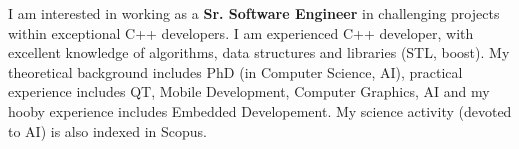 
I am interested in working as a \textbf{Sr. Software Engineer} in challenging projects within exceptional C++ developers. I am experienced C++ developer, with excellent knowledge of algorithms, data structures and libraries (STL, boost). My theoretical background includes PhD (in Computer Science, AI), practical experience includes QT, Mobile Development, Computer Graphics, AI and my hooby experience includes Embedded Developement. My science activity (devoted to AI) is also indexed in Scopus.